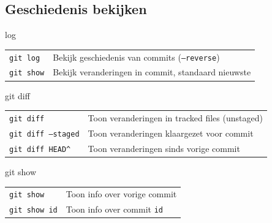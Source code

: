 \subsection{Geschiedenis bekijken}
\begin{frame}{log}
	\begin{tabular}{ll}
		\texttt{git log}& Bekijk geschiedenis van commits (\texttt{--reverse})\\
		\texttt{git show}& Bekijk veranderingen in commit, standaard nieuwste
	\end{tabular}
\end{frame}

\begin{frame}{git diff}
	\begin{tabular}{ll}
		\texttt{git diff}&Toon veranderingen in tracked files (unstaged)\\
		\texttt{git diff --staged}&Toon veranderingen klaargezet voor commit\\
		\texttt{git diff HEAD\^}&Toon veranderingen sinds vorige commit
	\end{tabular}
\end{frame}

\begin{frame}{git show}
	\begin{tabular}{l l}
		\texttt{git show}&Toon info over vorige commit\\
		\texttt{git show id}&Toon info over commit \texttt{id}\\
	\end{tabular}
\end{frame}

